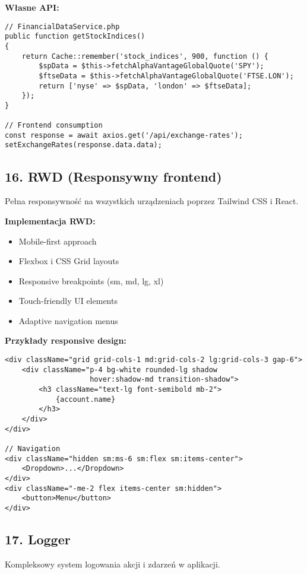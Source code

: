 \textbf{Własne API:}
\begin{verbatim}
// FinancialDataService.php
public function getStockIndices()
{
    return Cache::remember('stock_indices', 900, function () {
        $spData = $this->fetchAlphaVantageGlobalQuote('SPY');
        $ftseData = $this->fetchAlphaVantageGlobalQuote('FTSE.LON');
        return ['nyse' => $spData, 'london' => $ftseData];
    });
}

// Frontend consumption
const response = await axios.get('/api/exchange-rates');
setExchangeRates(response.data.data);
\end{verbatim}

\subsection{16. RWD (Responsywny frontend)}

Pełna responsywność na wszystkich urządzeniach poprzez Tailwind CSS i React.

\textbf{Implementacja RWD:}
\begin{itemize}
    \item Mobile-first approach
    \item Flexbox i CSS Grid layouts
    \item Responsive breakpoints (sm, md, lg, xl)
    \item Touch-friendly UI elements
    \item Adaptive navigation menus
\end{itemize}

\textbf{Przykłady responsive design:}
\begin{verbatim}
<div className="grid grid-cols-1 md:grid-cols-2 lg:grid-cols-3 gap-6">
    <div className="p-4 bg-white rounded-lg shadow
                    hover:shadow-md transition-shadow">
        <h3 className="text-lg font-semibold mb-2">
            {account.name}
        </h3>
    </div>
</div>

// Navigation
<div className="hidden sm:ms-6 sm:flex sm:items-center">
    <Dropdown>...</Dropdown>
</div>
<div className="-me-2 flex items-center sm:hidden">
    <button>Menu</button>
</div>
\end{verbatim}

\subsection{17. Logger}

Kompleksowy system logowania akcji i zdarzeń w aplikacji.

